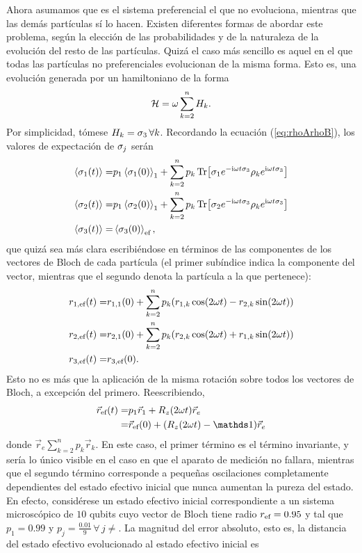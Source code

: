 Ahora asumamos que es el sistema preferencial el que no evoluciona, mientras que las demás partículas sí lo hacen. Existen diferentes formas de abordar este problema, según la elección de las probabilidades y de la naturaleza de la evolución del resto de las partículas. Quizá el caso más sencillo es aquel en el que todas las partículas no preferenciales evolucionan de la misma forma. Esto es, una evolución generada por un hamiltoniano de la forma
\begin{equation}
    \mathcal{H}=\omega \sum_{k=2}^{n}H_{k}.\nonumber
\end{equation}
Por simplicidad, tómese $H_{k}=\sigma_{3}\,\forall k$. Recordando la ecuación (\ref{eq:rhoArhoB}), los valores de expectación de $\sigma_{j}$ serán
\begin{align}
    \expval{\sigma_{1}(t)}=&p_{1} \expval{\sigma_{1}(0)}_{1}+\sum_{k=2}^{n}p_{k}\Tr[\sigma_{1}e^{-\text{i}\omega t\sigma_{3}} \rho_{k} e^{\text{i}\omega t\sigma_{3}}]\nonumber\\
    \expval{\sigma_{2}(t)}=&p_{1} \expval{\sigma_{2}(0)}_{1}+\sum_{k=2}^{n}p_{k}\Tr[\sigma_{2}e^{-\text{i}\omega t\sigma_{3}} \rho_{k} e^{\text{i}\omega t\sigma_{3}}]\nonumber\\
    \expval{\sigma_{3}(t)}=&\expval{\sigma_{3}(0)}_{\text{ef}},\nonumber
\end{align}
que quizá sea más clara escribiéndose en términos de las componentes de los vectores de Bloch de cada partícula (el primer subíndice indica la componente del vector, mientras que el segundo denota la partícula a la que pertenece):
\begin{align}
    r_{1,\text{ef}}(t)=&r_{1,1}(0)+\sum_{k=2}^{n}p_{k}(r_{1,k}\cos(2\omega t)-r_{2,k}\sin(2\omega t))\nonumber\\
    r_{2,\text{ef}}(t)=&r_{2,1}(0)+\sum_{k=2}^{n}p_{k}(r_{2,k}\cos(2\omega t)+r_{1,k}\sin(2\omega t))\nonumber\\
    r_{3,\text{ef}}(t)=&r_{3,\text{ef}}(0).\nonumber
\end{align}
Esto no es más que la aplicación de la misma rotación sobre todos los vectores de Bloch, a excepción del primero. Reescribiendo,
\begin{align}
    \vec{r}_{\ef}(t)=&p_{1}\vec{r}_{1}+R_{z}(2\omega t)\vec{r}_{e}\nonumber\\
    =&\vec{r}_{\ef}(0)+(R_{z}(2\omega t)-\Id)\vec{r}_{e}\nonumber
\end{align}
donde $\vec{r}_{e}\sum_{k=2}^{n}p_{k}\vec{r}_{k}$.
En este caso, el primer término es el término invariante, y sería lo único visible en el caso en que el aparato de medición no fallara, mientras que el segundo término corresponde a pequeñas oscilaciones completamente dependientes del estado efectivo inicial que nunca aumentan la pureza del estado. En efecto, considérese un estado efectivo inicial correspondiente a un sistema microscópico de $10$ qubits cuyo vector de Bloch tiene radio $r_{\text{ef}}=0.95$ y tal que $p_{1}=0.99$ y $p_{j}=\frac{0.01}{9}\,\forall\,j\neq $. La magnitud del error absoluto, esto es, la distancia del estado efectivo evolucionado al estado efectivo inicial es
